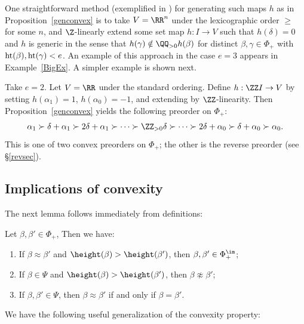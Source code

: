 One straightforward method (exemplified in \cite[Example 3.6]{McNRepKLR3}) for generating such maps \(h\) as in Proposition~\ref{genconvex} is to 
take \(V=\RR^n\) under the lexicographic order \(\geq\) for some \(n\), and \(\Z\)-linearly extend some set map \(h: I \to V\) such that \(h(\delta)= 0\) and \(h\) is generic in the sense that \(h(\gamma) \notin \QQ_{> 0} h(\beta)\) for distinct \(\beta, \gamma \in \Phi_+\) with \(\textup{ht}(\beta), \textup{ht}(\gamma) < e\).
An example of this approach in the case \(e=3\) appears in Example~\ref{BigEx}. A simpler example is shown next. 

\begin{exam}\label{e2order}
Take \(e=2\). Let \(V = \RR\) under the standard ordering. Define \(h: \ZZ I \to V\) by setting \(h(\alpha_1) = 1\), \(h(\alpha_0) = -1\), and extending by \(\ZZ\)-linearity. Then Proposition~\ref{genconvex} yields the following preorder on \(\Phi_+\):
\begin{align*}
\alpha_1 \succ
\delta+\alpha_1 
\succ
2\delta+\alpha_1
\succ
\cdots
\succ
\ZZ_{>0}\delta
\succ
\cdots
\succ
2\delta+\alpha_0
\succ
\delta+\alpha_0
\succ
\alpha_0.
\end{align*}
This is one of two convex preorders on \(\Phi_+\); the other is the reverse preorder (see \S\ref{revsec}).
\end{exam}

\subsection{Implications of convexity} 
The next lemma follows immediately from definitions:
\begin{lemma}\label{notapprox}
Let \(\beta, \beta' \in \Phi_+\), Then we have:
\begin{enumerate}
\item If \(\beta \approx \beta'\) and \(\height(\beta) > \height(\beta')\), then \(\beta, \beta' \in \Phi_+^\im\); \label{cond:notapprox1}
\item If \(\beta \in \Psi\) and \(\height(\beta) > \height(\beta')\), then \(\beta \not \approx \beta'\); \label{cond:notapprox2}
\item If \(\beta, \beta' \in \Psi\), then \(\beta \approx \beta'\) if and only if \(\beta = \beta'\). \label{cond:notapprox3}
\end{enumerate}
\end{lemma}


We have the following useful generalization of the convexity property:

